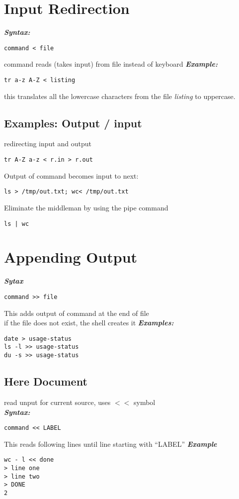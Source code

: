 \documentclass{report}
\begin{document}
\section{Input Redirection}
\textit{\textbf{Syntax:}}
\begin{verbatim}
command < file
\end{verbatim}
command reads (takes input) from file instead of keyboard
\bigbreak \noindent
\textit{\textbf{Example:}}
\begin{verbatim}
tr a-z A-Z < listing
\end{verbatim}
this translates all the lowercase characters from the file \textit{listing} to uppercase.
\subsection{Examples: Output / input}
redirecting input and output
\begin{verbatim}
tr A-Z a-z < r.in > r.out
\end{verbatim}
Output of command becomes input to next:
\begin{verbatim}
ls > /tmp/out.txt; wc< /tmp/out.txt
\end{verbatim}
Eliminate the middleman by using the pipe command
\begin{verbatim}
ls | wc
\end{verbatim}
\section{Appending Output}
\textit{\textbf{Sytax}}
\begin{verbatim}
command >> file
\end{verbatim}
This adds output of command at the end of file \\ 
if the file does not exist, the shell creates it
\bigbreak \noindent
\textit{\textbf{Examples:}}
\begin{verbatim}
date > usage-status
ls -l >> usage-status
du -s >> usage-status
\end{verbatim}
\subsection{Here Document}
read unput for current source, uses $<<$ symbol \\
\textit{\textbf{Syntax:}}
\begin{verbatim}
command << LABEL
\end{verbatim}
This reads following lines until line starting with ``LABEL''
\bigbreak \noindent
\textit{\textbf{Example}}
\begin{verbatim}
wc - l << done
> line one
> line two
> DONE
2
\end{verbatim}
\end{document}
